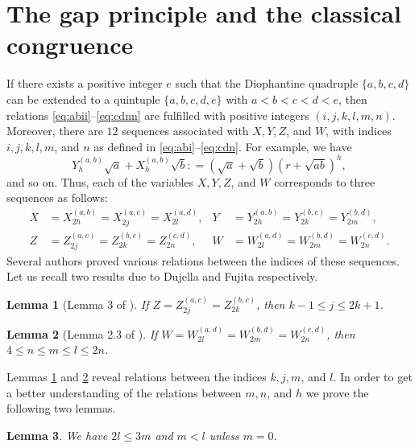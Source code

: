 \documentclass{amsart}
\newtheorem{lemma}{Lemma}
\theoremstyle{definition}
\begin{document}
\section{The gap principle and the classical congruence}\label{sec:5}

If there exists a positive integer $e$ such that the Diophantine quadruple $\{a,b,c,d\}$ can be extended
to a quintuple $\{a,b,c,d,e\}$ with $a<b<c<d<e$, then relations \eqref{eq:abii}--\eqref{eq:cdnn}
are fulfilled with positive integers $(i,j,k,l,m,n)$.  Moreover, there are $12$ sequences associated with $X,Y,Z$, and $W$, 
with indices $i,j,k,l,m$, and $n$ as defined in \eqref{eq:abi}--\eqref{eq:cdn}. For example, we have 
$$Y^{(a,b)}_{h} \sqrt{a} + X^{(a,b)}_h \sqrt{b}: = (\sqrt{a} + \sqrt{b})(r+\sqrt{ab})^{h},$$ 
and so on. Thus, each of the variables $X,Y,Z$, and $W$ corresponds to three sequences as follows:
\begin{align*}
X&=X^{(a,b)}_{2h} = X^{(a,c)}_{2j} = X^{(a,d)}_{2l},& Y&=Y^{(a,b)}_{2h} = Y^{(b,c)}_{2k} = Y^{(b,d)}_{2m}, \\
Z&=Z^{(a,c)}_{2j} = Z^{(b,c)}_{2k} = Z^{(c,d)}_{2n},& W&=W^{(a,d)}_{2l} = W^{(b,d)}_{2m} = W^{(c,d)}_{2n}.
\end{align*}
Several authors proved various relations between the indices of these sequences. Let us recall two results
due to Dujella \cite{Dujella:2004} and Fujita \cite{Fujita-number} respectively.

\begin{lemma}[Lemma 3 of \cite{Dujella:2004}]\label{lem:jk}
If $Z=Z^{(a,c)}_{2j} = Z^{(b,c)}_{2k}$, then $k-1\le j \le 2k+1$. 
\end{lemma} 

\begin{lemma}[Lemma 2.3 of \cite{Fujita-number}]\label{lem:lmn}
If $W=W^{(a,d)}_{2l} = W^{(b,d)}_{2m} = W^{(c,d)}_{2n}$, then $4\le n\le m\le l \le  2n$.
\end{lemma}

Lemmas \ref{lem:jk} and \ref{lem:lmn} reveal relations between the indices $k,j,m$, and $l$. In order to
get a better understanding of the relations between $m,n$, and $h$ we prove the following two lemmas.

\begin{lemma}\label{lem:2l3m}
We have $2l\le 3 m$ and $m<l$ unless $m=0$.
\end{lemma}
\end{document}

